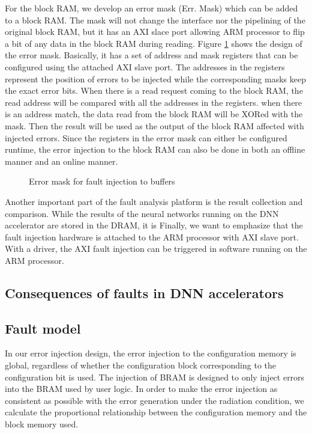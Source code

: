 For the block RAM, we develop an error mask (Err. Mask) which can be 
added to a block RAM. The mask will not change the interface nor the 
pipelining of the original block RAM, but it has an AXI slace port
allowing ARM processor to flip a bit of any data in the block RAM 
during reading. Figure \ref{fig:error-mask} shows the design of the error mask.
Basically, it has a set of address and mask registers that can be configured 
using the attached AXI slave port. The addresses in the registers represent 
the position of errors to be injected while the corresponding masks 
keep the exact error bits. When there is a read request coming 
to the block RAM, the read address will be compared with all 
the addresses in the registers. when there is an address match, 
the data read from the block RAM will be XORed with the mask.
Then the result will be used as the output of the block RAM 
affected with injected errors. Since the registers in the error mask 
can either be configured runtime, the error injection to 
the block RAM can also be done in both an offline manner 
and an online manner.

\begin{figure}
    \caption{Error mask for fault injection to buffers}
\vspace{-0.5em}
\label{fig:error-mask}
\end{figure}

Another important part of the fault analysis platform is the result 
collection and comparison. While the results of the neural networks 
running on the DNN accelerator are stored in the DRAM, it is 
Finally, we want to emphasize that the fault injection hardware is 
attached to the ARM processor with AXI slave port. With a 
driver, the AXI fault injection can be triggered in software running 
on the ARM processor.

\subsection{Consequences of faults in DNN accelerators}
\subsection{Fault model}
In our error injection design, the error injection to the 
configuration memory is global, regardless of whether the 
configuration block corresponding to the configuration bit 
is used. The injection of BRAM is designed to only inject 
errors into the BRAM used by user logic. In order to make 
the error injection as consistent as possible with the 
error generation under the radiation condition, we 
calculate the proportional relationship between the 
configuration memory and the block memory used.

